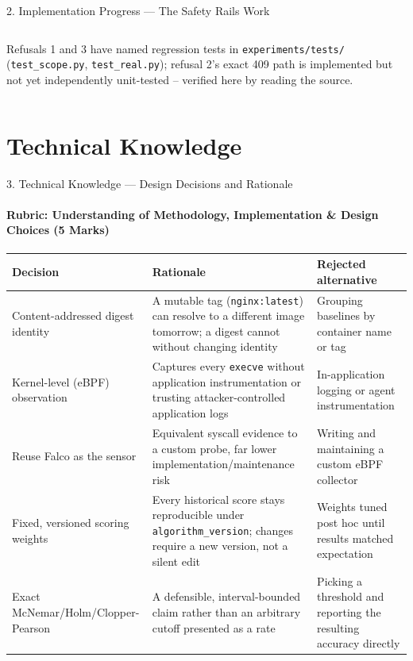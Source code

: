 \documentclass[aspectratio=169, 11pt]{beamer}
\begin{document}
\begin{frame}{2. Implementation Progress --- The Safety Rails Work}
\begin{columns}[T]
\smallskip
{\scriptsize Refusals 1 and 3 have named regression tests in
\texttt{experiments/tests/} (\texttt{test\_scope.py},
\texttt{test\_real.py}); refusal 2's exact 409 path is implemented but not
yet independently unit-tested -- verified here by reading the source.}
\end{columns}
\end{frame}

\section{Technical Knowledge}
\begin{frame}{3. Technical Knowledge --- Design Decisions and Rationale}
\framesubtitle{Rubric: Understanding of Methodology, Implementation \& Design Choices (5 Marks)}

\centering
\begin{table}
\tiny
\renewcommand{\arraystretch}{1.05}
\begin{tabular}{p{3.1cm} p{4.6cm} p{4.0cm}}
\toprule
\textbf{Decision} & \textbf{Rationale} & \textbf{Rejected alternative} \\
\midrule
Content-addressed digest identity
& A mutable tag (\texttt{nginx:latest}) can resolve to a different image tomorrow; a digest cannot without changing identity
& Grouping baselines by container name or tag \\

Kernel-level (eBPF) observation
& Captures every \texttt{execve} without application instrumentation or trusting attacker-controlled application logs
& In-application logging or agent instrumentation \\

Reuse Falco as the sensor
& Equivalent syscall evidence to a custom probe, far lower implementation/maintenance risk
& Writing and maintaining a custom eBPF collector \\

Fixed, versioned scoring weights
& Every historical score stays reproducible under \texttt{algorithm\_version}; changes require a new version, not a silent edit
& Weights tuned post hoc until results matched expectation \\

Exact McNemar/Holm/Clopper-Pearson
& A defensible, interval-bounded claim rather than an arbitrary cutoff presented as a rate
& Picking a threshold and reporting the resulting accuracy directly \\


\end{tabular}
\end{table}
\end{frame}
\end{document}
